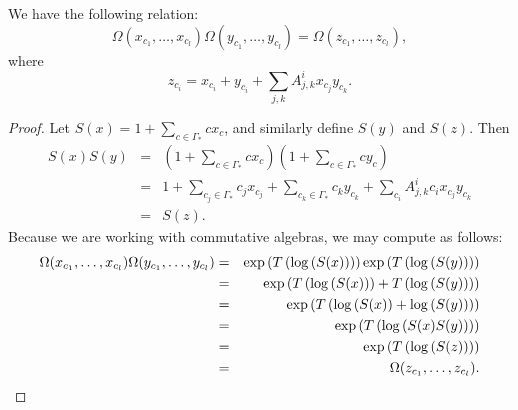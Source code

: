 \begin{proposition} \label{theta_product_prop}
We have the following relation:
\[
\Omega(x_{c_1}, \ldots, x_{c_l}) \Omega(y_{c_1}, \ldots, y_{c_l}) = \Omega(z_{c_1}, \ldots, z_{c_l}),
\]
where
\[
z_{c_i} = x_{c_i} + y_{c_i} + \sum_{j,k}A_{j,k}^{i}x_{c_j} y_{c_k}.
\]
\end{proposition}
\begin{proof}
Let $S(x) = 1 + \sum_{c \in \Gamma_*} c x_c$, and similarly define $S(y)$ and $S(z)$. Then
\begin{eqnarray*}
S(x)S(y) &=& \left(1 + \sum_{c \in \Gamma_*} c x_c\right)\left(1 + \sum_{c \in \Gamma_*} c y_c\right) \\
&=& 1 + \sum_{c_j \in \Gamma_*} c_j x_{c_j} + \sum_{c_k \in \Gamma_*} c_k y_{c_k} + \sum_{c_i} A_{j,k}^i c_i x_{c_j}y_{c_k} \\
&=& S(z).
\end{eqnarray*}
Because we are working with commutative algebras, we may compute as follows:
\begin{eqnarray*}
\Omega(x_{c_1}, \ldots, x_{c_l}) \Omega(y_{c_1}, \ldots, y_{c_l})
&=& \exp\left(T\left(\log\left(S(x)\right)\right)\right) \exp\left(T\left(\log\left(S(y)\right)\right)\right) \\
&=& \exp\left(T\left(\log\left(S(x)\right)\right) + T\left(\log\left(S(y)\right)\right)\right) \\
&=&\exp\left(T\left(\log\left(S(x)\right)+\log\left(S(y)\right)\right)\right) \\
&=&\exp\left(T\left(\log\left(S(x)S(y)\right)\right)\right) \\
&=&\exp\left(T\left(\log\left(S(z)\right)\right)\right) \\
&=& \Omega(z_{c_1}, \ldots, z_{c_l}).\qedhere
\end{eqnarray*}
\end{proof}

